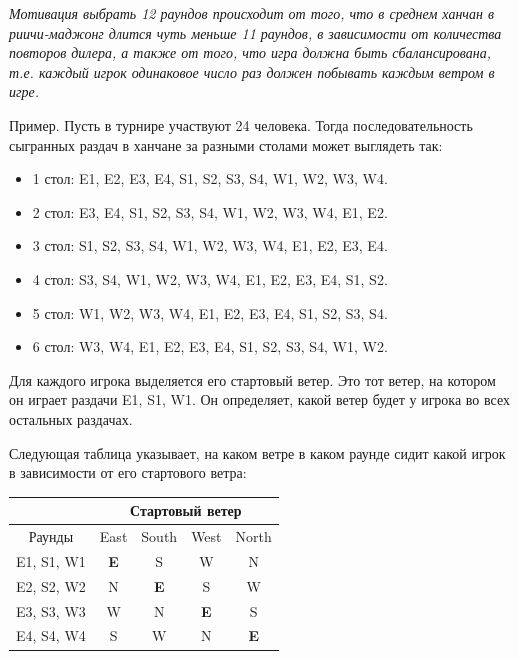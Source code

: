 \begin{additional}
\vspace{0.3cm}

\textit{Мотивация выбрать 12 раундов происходит от того, что в среднем ханчан в риичи-маджонг длится чуть меньше 11 раундов, в зависимости от количества повторов дилера, а также от того, что игра должна быть сбалансирована, т.е. каждый игрок одинаковое число раз должен побывать каждым ветром в игре.}

\vspace{0.3cm}

Пример. Пусть в турнире участвуют 24 человека. Тогда последовательность сыгранных раздач в ханчане за разными столами может выглядеть так:

\begin{itemize}
	\item 1 стол: E1, E2, E3, E4, S1, S2, S3, S4, W1, W2, W3, W4.
	\item 2 стол: E3, E4, S1, S2, S3, S4, W1, W2, W3, W4, E1, E2.
	\item 3 стол: S1, S2, S3, S4, W1, W2, W3, W4, E1, E2, E3, E4.
	\item 4 стол: S3, S4, W1, W2, W3, W4, E1, E2, E3, E4, S1, S2.
	\item 5 стол: W1, W2, W3, W4, E1, E2, E3, E4, S1, S2, S3, S4.
	\item 6 стол: W3, W4, E1, E2, E3, E4, S1, S2, S3, S4, W1, W2.
\end{itemize}

\vspace{0.3cm}

Для каждого игрока выделяется его стартовый ветер. Это тот ветер, на котором он играет раздачи E1, S1, W1. Он определяет, какой ветер будет у игрока во всех остальных раздачах.

\vspace{0.3cm}

Следующая таблица указывает, на каком ветре в каком раунде сидит какой игрок в зависимости от его стартового ветра:

\begin{tabular}{|c|c|c|c|c|}
	\hline
	& \multicolumn{4}{c|}{Стартовый ветер} \\
	\hline
	Раунды & East & South & West & North \\
	\hline
	E1, S1, W1 & \textbf{E} & S & W & N \\
	\hline
	E2, S2, W2 & N & \textbf{E} & S & W \\
	\hline
	E3, S3, W3 & W & N & \textbf{E} & S \\
	\hline
	E4, S4, W4 & S & W & N & \textbf{E} \\
	\hline
\end{tabular}


\end{additional}
